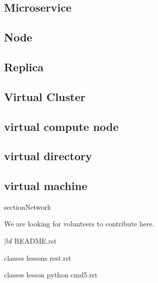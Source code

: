 \documentclass[9pt,twocolumn,twoside]{styles/osajnl}
\begin{document}


\subsection{Microservice}



\subsection{Node}



\subsection{Replica}



\subsection{Virtual Cluster}



\subsection{virtual compute node}



\subsection{virtual directory}



\subsection{virtual machine}


section{Network}

We are looking for volunteers to contribute here.

\appendix

{|bf README.rst}

classes lessons rest.rst

classes lesson python cmd5.rst

\end{document}

